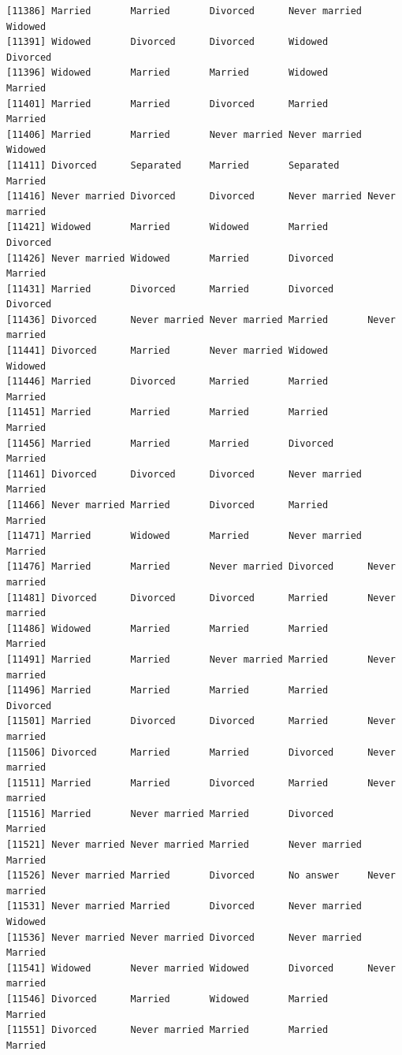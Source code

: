 \documentclass[
  letterpaper,
  DIV=11,
  numbers=noendperiod,
  oneside]{scrartcl}
\begin{document}
\begin{verbatim}
[11386] Married       Married       Divorced      Never married Widowed      
[11391] Widowed       Divorced      Divorced      Widowed       Divorced     
[11396] Widowed       Married       Married       Widowed       Married      
[11401] Married       Married       Divorced      Married       Married      
[11406] Married       Married       Never married Never married Widowed      
[11411] Divorced      Separated     Married       Separated     Married      
[11416] Never married Divorced      Divorced      Never married Never married
[11421] Widowed       Married       Widowed       Married       Divorced     
[11426] Never married Widowed       Married       Divorced      Married      
[11431] Married       Divorced      Married       Divorced      Divorced     
[11436] Divorced      Never married Never married Married       Never married
[11441] Divorced      Married       Never married Widowed       Widowed      
[11446] Married       Divorced      Married       Married       Married      
[11451] Married       Married       Married       Married       Married      
[11456] Married       Married       Married       Divorced      Married      
[11461] Divorced      Divorced      Divorced      Never married Married      
[11466] Never married Married       Divorced      Married       Married      
[11471] Married       Widowed       Married       Never married Married      
[11476] Married       Married       Never married Divorced      Never married
[11481] Divorced      Divorced      Divorced      Married       Never married
[11486] Widowed       Married       Married       Married       Married      
[11491] Married       Married       Never married Married       Never married
[11496] Married       Married       Married       Married       Divorced     
[11501] Married       Divorced      Divorced      Married       Never married
[11506] Divorced      Married       Married       Divorced      Never married
[11511] Married       Married       Divorced      Married       Never married
[11516] Married       Never married Married       Divorced      Married      
[11521] Never married Never married Married       Never married Married      
[11526] Never married Married       Divorced      No answer     Never married
[11531] Never married Married       Divorced      Never married Widowed      
[11536] Never married Never married Divorced      Never married Married      
[11541] Widowed       Never married Widowed       Divorced      Never married
[11546] Divorced      Married       Widowed       Married       Married      
[11551] Divorced      Never married Married       Married       Married      

\end{verbatim}
\end{document}
